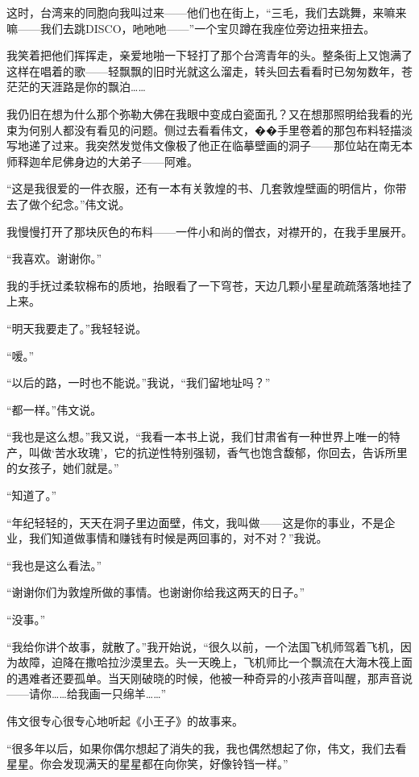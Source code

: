 \par 这时，台湾来的同胞向我叫过来——他们也在街上，“三毛，我们去跳舞，来嘛来嘛——我们去跳DISCO，吔吔吔——”一个宝贝蹲在我座位旁边扭来扭去。
\par 我笑着把他们挥挥走，亲爱地啪一下轻打了那个台湾青年的头。整条街上又饱满了这样在唱着的歌——轻飘飘的旧时光就这么溜走，转头回去看看时已匆匆数年，苍茫茫的天涯路是你的飘泊……
\par 我仍旧在想为什么那个弥勒大佛在我眼中变成白瓷面孔？又在想那照明给我看的光束为何别人都没有看见的问题。侧过去看看伟文，��手里卷着的那包布料轻描淡写地递了过来。我突然发觉伟文像极了他正在临摹壁画的洞子——那位站在南无本师释迦牟尼佛身边的大弟子——阿难。
\par “这是我很爱的一件衣服，还有一本有关敦煌的书、几套敦煌壁画的明信片，你带去了做个纪念。”伟文说。
\par 我慢慢打开了那块灰色的布料——一件小和尚的僧衣，对襟开的，在我手里展开。
\par “我喜欢。谢谢你。”
\par 我的手抚过柔软棉布的质地，抬眼看了一下穹苍，天边几颗小星星疏疏落落地挂了上来。
\par “明天我要走了。”我轻轻说。
\par “嗳。”
\par “以后的路，一时也不能说。”我说，“我们留地址吗？”
\par “都一样。”伟文说。
\par “我也是这么想。”我又说，“我看一本书上说，我们甘肃省有一种世界上唯一的特产，叫做‘苦水玫瑰’，它的抗逆性特别强韧，香气也饱含馥郁，你回去，告诉所里的女孩子，她们就是。”
\par “知道了。”
\par “年纪轻轻的，天天在洞子里边面壁，伟文，我叫做——这是你的事业，不是企业，我们知道做事情和赚钱有时候是两回事的，对不对？”我说。
\par “我也是这么看法。”
\par “谢谢你们为敦煌所做的事情。也谢谢你给我这两天的日子。”
\par “没事。”
\par “我给你讲个故事，就散了。”我开始说，“很久以前，一个法国飞机师驾着飞机，因为故障，迫降在撒哈拉沙漠里去。头一天晚上，飞机师比一个飘流在大海木筏上面的遇难者还要孤单。当天刚破晓的时候，他被一种奇异的小孩声音叫醒，那声音说——请你……给我画一只绵羊……”
\par 伟文很专心很专心地听起《小王子》的故事来。
\par “很多年以后，如果你偶尔想起了消失的我，我也偶然想起了你，伟文，我们去看星星。你会发现满天的星星都在向你笑，好像铃铛一样。”
